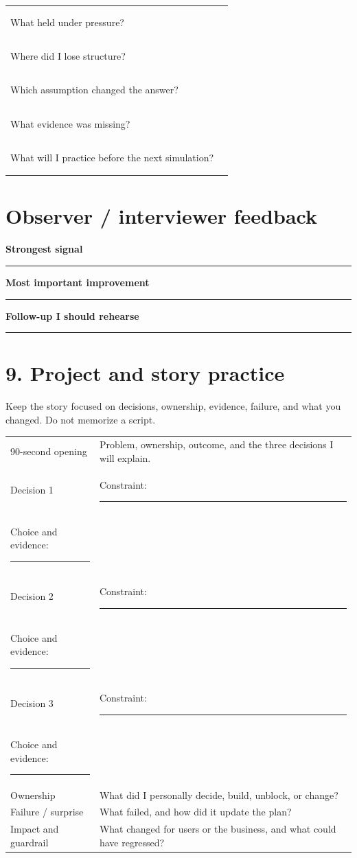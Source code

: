 \documentclass[10pt,letterpaper]{article}
\newcommand{\longline}{\par\noindent\rule{\linewidth}{.35pt}\par\vspace{.35em}}
\begin{document}
\begin{tabularx}{\linewidth}{@{}p{.3\linewidth} X@{}}
\toprule
What held under pressure? & \longline \longline\\
Where did I lose structure? & \longline \longline\\
Which assumption changed the answer? & \longline \longline\\
What evidence was missing? & \longline \longline\\
What will I practice before the next simulation? & \longline \longline\\
\bottomrule
\end{tabularx}

\section*{Observer / interviewer feedback}
\textbf{Strongest signal}\par
\longline
\textbf{Most important improvement}\par
\longline
\textbf{Follow-up I should rehearse}\par
\longline

\newpage
\section*{9. Project and story practice}
Keep the story focused on decisions, ownership, evidence, failure, and what you changed. Do not memorize a script.
\vspace{.1in}
\begin{tabularx}{\linewidth}{@{}p{.28\linewidth} X@{}}
\toprule
90-second opening & Problem, ownership, outcome, and the three decisions I will explain.\\[.5em]
Decision 1 & Constraint: \rule{.6\hsize}{.35pt}\\[-1pt] Choice and evidence: \rule{.5\hsize}{.35pt}\\[.4em]
Decision 2 & Constraint: \rule{.6\hsize}{.35pt}\\[-1pt] Choice and evidence: \rule{.5\hsize}{.35pt}\\[.4em]
Decision 3 & Constraint: \rule{.6\hsize}{.35pt}\\[-1pt] Choice and evidence: \rule{.5\hsize}{.35pt}\\[.4em]
Ownership & What did I personally decide, build, unblock, or change?\\[.5em]
Failure / surprise & What failed, and how did it update the plan?\\[.5em]
Impact and guardrail & What changed for users or the business, and what could have regressed?\\
\bottomrule
\end{tabularx}
\end{document}

